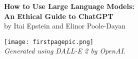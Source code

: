 \documentclass[12pt]{article}
\begin{document}

\begin{titlepage}
\begin{flushright}
\LARGE{\textbf{How to Use Large Language Models:}}\\
\vfill
\Huge{\textbf{An Ethical Guide to ChatGPT}}\\
    \vfill
    \large by Itai Epstein and
    \large Elinor Poole-Dayan
\vfill
\vfill


\begin{figure*}[h!]
    \begin{flushright}
    \texttt{[image: firstpagepic.png]}\\
    \hspace*{0pt}\hfill \textit{Generated using DALL-E 2 by OpenAI.}
    \end{flushright}
\end{figure*}
 
  
\end{flushright}
\end{titlepage}
\tableofcontents
\newpage

\end{document}
